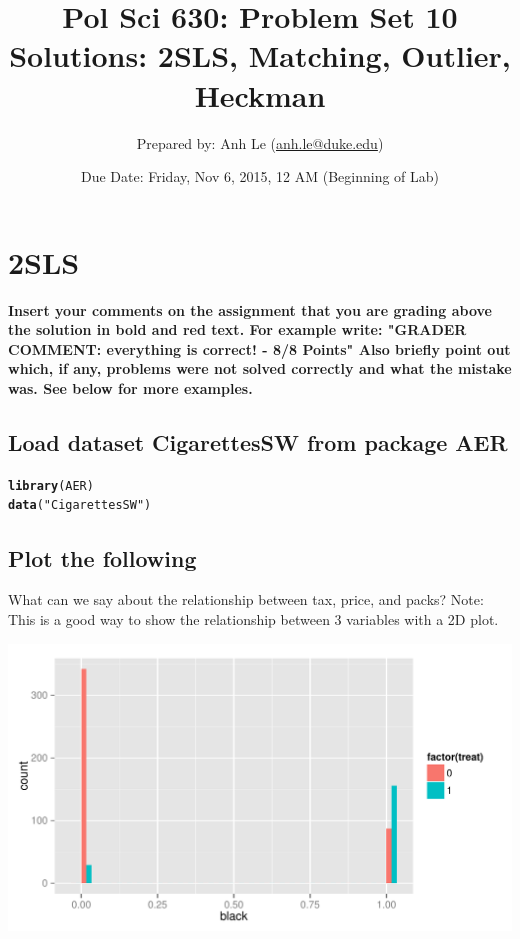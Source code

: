 \documentclass{article}\usepackage[]{graphicx}\usepackage[]{color}
\makeatletter
\def\maxwidth{ %
  \ifdim\Gin@nat@width>\linewidth
    \linewidth
  \else
    \Gin@nat@width
  \fi
}
\newcommand{\hlstr}[1]{\textcolor[rgb]{0.192,0.494,0.8}{#1}}%
\newcommand{\hlstd}[1]{\textcolor[rgb]{0.345,0.345,0.345}{#1}}%
\newcommand{\hlkwd}[1]{\textcolor[rgb]{0.737,0.353,0.396}{\textbf{#1}}}%
\newenvironment{kframe}{%
 \def\at@end@of@kframe{}%
 \ifinner\ifhmode%
  \def\at@end@of@kframe{\end{minipage}}%
  \begin{minipage}{\columnwidth}%
 \fi\fi%
 \def\FrameCommand##1{\hskip\@totalleftmargin \hskip-\fboxsep
 \colorbox{shadecolor}{##1}\hskip-\fboxsep
     \hskip-\linewidth \hskip-\@totalleftmargin \hskip\columnwidth}%
 \MakeFramed {\advance\hsize-\width
   \@totalleftmargin\z@ \linewidth\hsize
   \@setminipage}}%
 {\par\unskip\endMakeFramed%
 \at@end@of@kframe}
\newenvironment{knitrout}{}{} %
\makeatother
\begin{document}
\title{Pol Sci 630:  Problem Set 10 Solutions: 2SLS, Matching, Outlier, Heckman}

\author{Prepared by: Anh Le (\href{mailto:anh.le@duke.edu}{anh.le@duke.edu})}

\date{Due Date: Friday, Nov 6, 2015, 12 AM (Beginning of Lab)}

\maketitle

\section{2SLS}

\textbf{\color{red} Insert your comments on the assignment that you are grading above the solution in bold and red text. For example write: "GRADER COMMENT: everything is correct! - 8/8 Points" Also briefly point out which, if any, problems were not solved correctly and what the mistake was. See below for more examples.}

\subsection{Load dataset CigarettesSW from package AER}

\begin{knitrout}
\color{fgcolor}\begin{kframe}
\begin{alltt}
\hlkwd{library}\hlstd{(AER)}
\hlkwd{data}\hlstd{(}\hlstr{"CigarettesSW"}\hlstd{)}
\end{alltt}
\end{kframe}
\end{knitrout}

\subsection{Plot the following}

What can we say about the relationship between tax, price, and packs? Note: This is a good way to show the relationship between 3 variables with a 2D plot.

\begin{knitrout}
\color{fgcolor}
\includegraphics[width=\maxwidth]{figure/unnamed-chunk-2-1} 

\end{knitrout}
\end{document}
